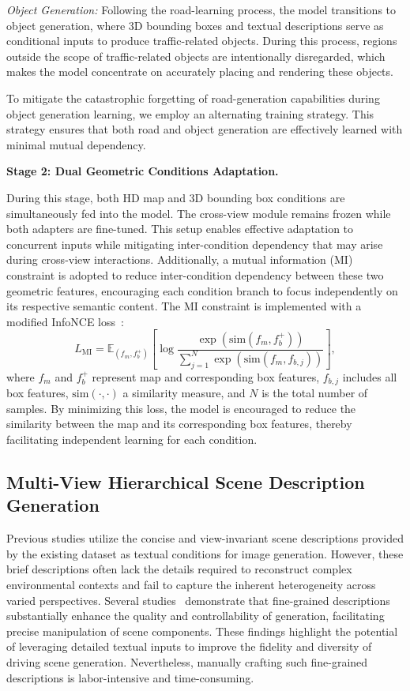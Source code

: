 \textit{{Object Generation:}}
Following the road-learning process, the model transitions to object generation, where 3D bounding boxes and textual descriptions serve as conditional inputs to produce traffic-related objects. 
During this process, regions outside the scope of traffic-related objects are intentionally disregarded, which makes the model concentrate on accurately placing and rendering these objects.

To mitigate the catastrophic forgetting of road-generation capabilities during object generation learning, we employ an alternating training strategy. This strategy ensures that both road and object generation are effectively learned with minimal mutual dependency. 


\textbf{Stage 2: Dual Geometric Conditions Adaptation.}

During this stage, both HD map and 3D bounding box conditions are simultaneously fed into the model. The cross-view module remains frozen while both adapters are fine-tuned. 
This setup enables effective adaptation to concurrent inputs while mitigating inter-condition dependency that may arise during cross-view interactions.
Additionally, a mutual information (MI) constraint is adopted to reduce inter-condition dependency between these two geometric features, encouraging each condition branch to focus independently on its respective semantic content.
The MI constraint is implemented with a modified InfoNCE loss~\cite{oord2018representation}:
\begin{equation}
	{L}_{\text{MI}} = \mathbb{E}_{(f_m, f_b^+)} \left[ \log \frac{\exp(\text{sim}(f_m, f_b^+))}{\sum\limits_{j=1}^{N} \exp(\text{sim}(f_m, f_{b,j}))} \right],
\end{equation}where $f_m$ and $f_b^+$ represent map and corresponding box features, $f_{b,j}$ includes all box features, $\text{sim}(\cdot, \cdot)$ a similarity measure, and $N$ is the total number of samples. 
By minimizing this loss, the model is encouraged to reduce the similarity between the map and its corresponding box features, thereby facilitating independent learning for each condition.


\subsection{Multi-View Hierarchical Scene Description Generation}
Previous studies utilize the concise and view-invariant scene descriptions provided by the existing dataset as textual conditions for image generation. However, these brief descriptions often lack the details required to reconstruct complex environmental contexts and fail to capture the inherent heterogeneity across varied perspectives. 
Several studies~\cite{nie2024compositional,lian2024llmgrounded, wu2025paragraph} demonstrate that fine-grained descriptions substantially enhance the quality and controllability of generation, facilitating precise manipulation of scene components. 
These findings highlight the potential of leveraging detailed textual inputs to improve the fidelity and diversity of driving scene generation.
Nevertheless, manually crafting such fine-grained descriptions is labor-intensive and time-consuming. 

